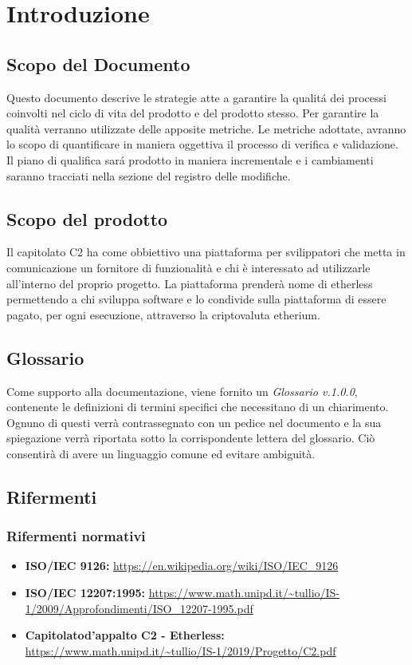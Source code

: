 \section{Introduzione}

\subsection{Scopo del Documento}
Questo documento descrive le strategie atte a garantire la qualit\'a dei processi coinvolti nel ciclo di vita del prodotto e del prodotto stesso. Per garantire la qualità verranno utilizzate delle apposite metriche. Le metriche adottate, avranno lo scopo di quantificare in maniera oggettiva il processo di verifica e validazione. Il piano di qualifica sar\'a prodotto in maniera incrementale e i cambiamenti saranno tracciati nella sezione del registro delle modifiche.

\subsection{Scopo del prodotto}
Il capitolato C2 ha come obbiettivo una piattaforma per svilippatori che metta
in comunicazione un fornitore di funzionalit\`a e chi \`e interessato ad utilizzarle
all'interno del proprio progetto.
La piattaforma prender\`a nome di etherless permettendo a chi sviluppa software e
lo condivide sulla piattaforma di essere pagato, per ogni esecuzione, attraverso
la criptovaluta etherium.


\subsection{Glossario}
Come supporto alla documentazione, viene fornito un \textit{Glossario v.1.0.0},
contenente le definizioni di termini specifici che necessitano di un chiarimento.
Ognuno di questi verr\`a contrassegnato con un pedice \glo nel documento e la sua
spiegazione verr\`a riportata sotto la corrispondente lettera del glossario. Ci\`o
consentir\`a di avere un linguaggio comune ed evitare ambiguit\`a.

\subsection{Rifermenti}
\subsubsection{Rifermenti normativi}
\begin{itemize}
	  \item \textbf{ISO/IEC 9126:} \url{https://en.wikipedia.org/wiki/ISO/IEC_9126}
	  \item \textbf{ISO/IEC 12207:1995:}  \url{https://www.math.unipd.it/~tullio/IS-1/2009/Approfondimenti/ISO_12207-1995.pdf}
  	  \item \textbf{Capitolato\glo d'appalto C2 - Etherless:} \url{https://www.math.unipd.it/~tullio/IS-1/2019/Progetto/C2.pdf}
\end{itemize}

